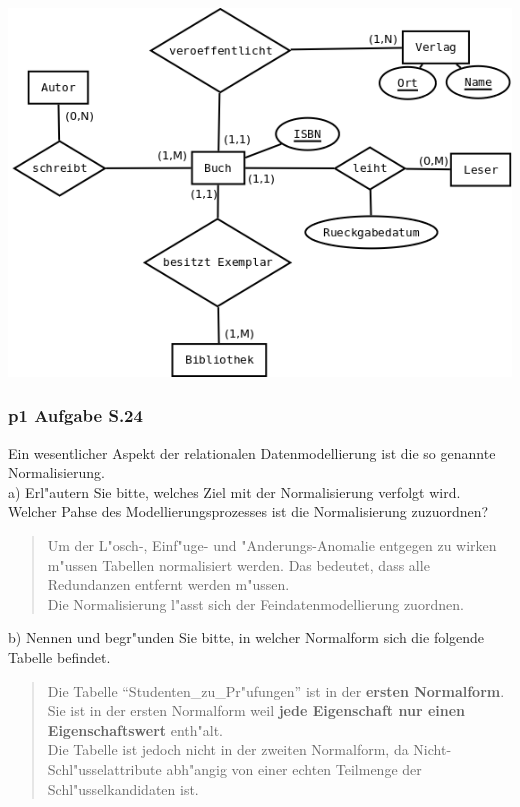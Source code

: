 \includegraphics[scale=0.5]{./inc/p1_umlaufgabe}

\subsubsection{p1 Aufgabe S.24}
Ein wesentlicher Aspekt der relationalen Datenmodellierung ist die so genannte Normalisierung.\\
\noindent
a) Erl"autern Sie bitte, welches Ziel mit der Normalisierung verfolgt wird.
Welcher Pahse des Modellierungsprozesses ist die Normalisierung zuzuordnen?\\

\begin{quote}
Um der L"osch-, Einf"uge- und "Anderungs-Anomalie entgegen zu wirken m"ussen Tabellen normalisiert werden.
Das bedeutet, dass alle Redundanzen entfernt werden m"ussen.\\
Die Normalisierung l"asst sich der Feindatenmodellierung zuordnen.
\end{quote}

\noindent
b) Nennen und begr"unden Sie bitte, in welcher Normalform sich die folgende Tabelle befindet.\\

\begin{quote}
Die Tabelle "`Studenten\_zu\_Pr"ufungen"' ist in der \textbf{ersten Normalform}.
Sie ist in der ersten Normalform weil \textbf{jede Eigenschaft nur einen Eigenschaftswert} enth"alt.\\
Die Tabelle ist jedoch nicht in der zweiten Normalform, da Nicht-Schl"usselattribute abh"angig von einer echten Teilmenge der Schl"usselkandidaten ist.
\end{quote}

